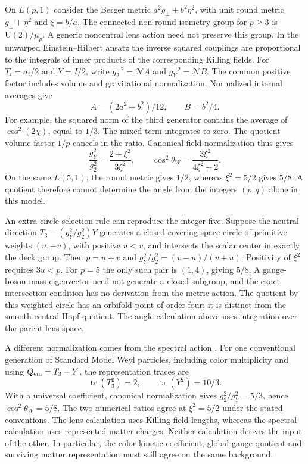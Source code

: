 \documentclass[11pt,oneside]{article}
\newcommand{\tr}{\operatorname{tr}}
\newcommand{\U}{\mathrm U}
\begin{document}
On \(L(p,1)\) consider the Berger metric \(a^2g_\perp+b^2\eta^2\), with unit round metric \(g_\perp+\eta^2\) and \(\xi=b/a\). The connected non-round isometry group for \(p\geq3\) is \(\U(2)/\mu_p\). A generic noncentral lens action need not preserve this group. In the unwarped Einstein--Hilbert ansatz the inverse squared couplings are proportional to the integrals of inner products of the corresponding Killing fields. For \(T_i=\sigma_i/2\) and \(Y=I/2\), write \(g_2^{-2}=\mathcal N A\) and \(g_Y^{-2}=\mathcal N B\). The common positive factor includes volume and gravitational normalization. Normalized internal averages give
\[
 A=(2a^2+b^2)/12,\qquad B=b^2/4.
\]
For example, the squared norm of the third generator contains the average of \(\cos^2(2\chi)\), equal to \(1/3\). The mixed term integrates to zero. The quotient volume factor \(1/p\) cancels in the ratio. Canonical field normalization thus gives
\[
 \frac{g_Y^2}{g_2^2}=\frac{2+\xi^2}{3\xi^2},
 \qquad \cos^2\theta_W=\frac{3\xi^2}{4\xi^2+2}.
\]
On the same \(L(5,1)\), the round metric gives \(1/2\), whereas \(\xi^2=5/2\) gives \(5/8\). A quotient therefore cannot determine the angle from the integers \((p,q)\) alone in this model.

An extra circle-selection rule can reproduce the integer five. Suppose the neutral direction \(T_3-(g_Y^2/g_2^2)Y\) generates a closed covering-space circle of primitive weights \((u,-v)\), with positive \(u<v\), and intersects the scalar center in exactly the deck group. Then \(p=u+v\) and \(g_Y^2/g_2^2=(v-u)/(v+u)\). Positivity of \(\xi^2\) requires \(3u<p\). For \(p=5\) the only such pair is \((1,4)\), giving \(5/8\). A gauge-boson mass eigenvector need not generate a closed subgroup, and the exact intersection condition has no derivation from the metric action. The quotient by this weighted circle has an orbifold point of order four; it is distinct from the smooth central Hopf quotient. The angle calculation above uses integration over the parent lens space.

A different normalization comes from the spectral action \cite{spectral}. For one conventional generation of Standard Model Weyl particles, including color multiplicity and using \(Q_{\rm em}=T_3+Y\), the representation traces are
\[
 \tr(T_3^2)=2,\qquad \tr(Y^2)=10/3 .
\]
With a universal coefficient, canonical normalization gives \(g_2^2/g_Y^2=5/3\), hence \(\cos^2\theta_W=5/8\). The two numerical ratios agree at \(\xi^2=5/2\) under the stated conventions. The lens calculation uses Killing-field lengths, whereas the spectral calculation uses represented matter charges. Neither calculation derives the input of the other. In particular, the color kinetic coefficient, global gauge quotient and surviving matter representation must still agree on the same background.
\end{document}
